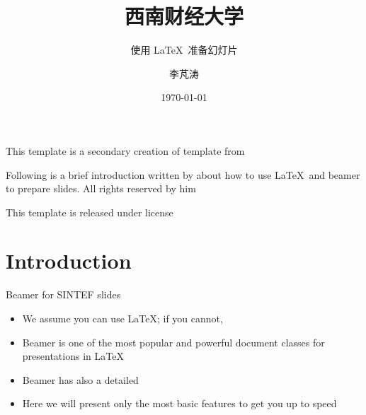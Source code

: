 \documentclass{beamer}
\title{西南财经大学}
\subtitle{使用 \LaTeX\ 准备幻灯片}
\author{李芃涛}
\date{\today}
\begin{document}
    
    \maketitle
    
    \begin{frame}
        This template is a secondary creation of  template from  \vspace{\baselineskip}
        
        Following is a brief introduction written by  about how to use \LaTeX\ and beamer to prepare slides. All rights reserved by him\vspace{\baselineskip}
        
        This template is released under  license
    \end{frame}
    
    \section{Introduction}
    
    \begin{frame}{Beamer for SINTEF slides}
        \begin{itemize}
            \item We assume you can use \LaTeX; if you cannot, 
            \item Beamer is one of the most popular and powerful document classes for presentations in \LaTeX
            \item Beamer has also a detailed 
            \item Here we will present only the most basic features to get you up to speed
        \end{itemize}
    \end{frame}
    
\end{document}
